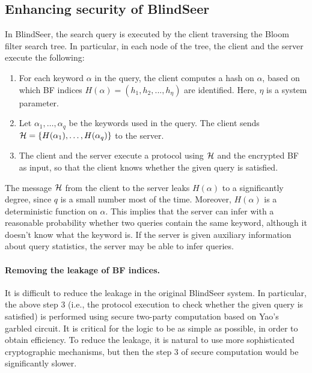 
\def\HHH{{\cal H}}
\subsection{Enhancing security of BlindSeer}

In BlindSeer, the search query is executed by the client traversing the Bloom filter
search tree. In particular, in each node of the tree, the client and the server
execute the following:

\begin{enumerate}
\item For each keyword $\alpha$ in the query, the client computes a hash on
$\alpha$, based on which BF indices $H(\alpha) =  (h_1, h_2, ..., h_\eta)$
are identified. Here, $\eta$ is a system parameter. 

\item Let $\alpha_1, \ldots, \alpha_q$ be the keywords used in the query.  The
  client sends $\HHH = \{H(\alpha_1), \ldots, H(\alpha_q)\}$ to the server. 

\item The client and the server execute a protocol using $\HHH$ and the
encrypted BF as input, so that the client knows whether the given query is
satisfied. 
\end{enumerate}

The message $\HHH$ from the client to the server leaks $H(\alpha)$ to
a significantly degree, since $q$ is a small number most of the time. Moreover,
$H(\alpha)$ is a deterministic function on $\alpha$. This implies that
 the server can infer with a reasonable probability whether two queries
contain the same keyword, although it doesn't know what the keyword is.  If the
server is given  auxiliary information about query statistics, the
server may be able to infer queries. 

\paragraph{Removing the leakage of BF indices.}

It is difficult to reduce the leakage in the original
BlindSeer system. In particular, the above step 3 (i.e., the protocol execution
to check whether the given query is satisfied) is performed using secure
two-party computation based on Yao's garbled circuit. It is critical
for the logic to be as simple as possible, in order to obtain efficiency. To
reduce the leakage, it is natural to use more sophisticated cryptographic mechanisms,
but then the step 3 of secure computation would be significantly slower. 

